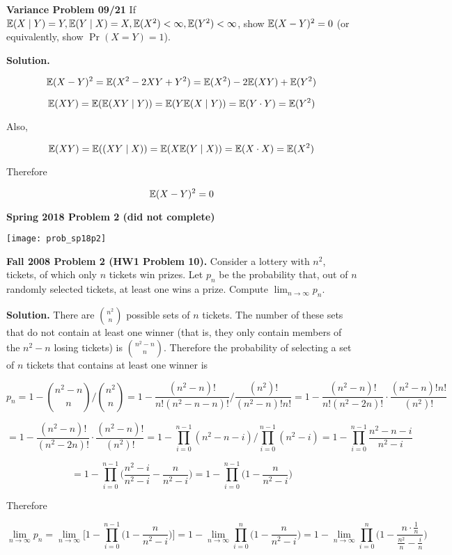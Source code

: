 \textbf{Variance Problem 09/21}  If \(\E(X \mid Y) = Y, \E(Y \mid X) = X, \E(X^2) < \infty, \E(Y^2) < \infty\), show \(\E(X-Y)^2 = 0 \) (or equivalently, show \(\Pr(X = Y) = 1\)).

\textbf{Solution.} 

\[
\E(X-Y)^2 = \E(X^2 - 2XY + Y^2) = \E(X^2) - 2 \E(XY) + \E(Y^2)
\]

\[
\E(XY) = \E( \E(XY\mid Y)) = \E(Y\E(X\mid Y)) = \E(Y \cdot Y) = \E(Y^2)
\]

Also,

\[
\E(XY) = \E((XY \mid X)) = \E(X \E(Y \mid X)) = \E( X \cdot X) = \E(X^2)
\]

Therefore

\[
\E(X-Y)^2 =0
\]


\textbf{Spring 2018 Problem 2 (did not complete)}

\texttt{[image: prob\_sp18p2]}

\textbf{Fall 2008 Problem 2 (HW1 Problem 10).} Consider a lottery with \(n^2\), tickets, of which only \(n\) tickets win prizes. Let \(p_n\) be the probability that, out of \(n\) randomly selected tickets, at least one wins a prize. Compute \(\lim_{n \to \infty} p_n\).

\textbf{Solution.} There are \(\binom{n^2}{n}\) possible sets of \(n\) tickets. The number of these sets that do not contain at least one winner (that is, they only contain members of the \(n^2 - n\) losing tickets) is \(\binom{n^2 - n}{n}\). Therefore the probability of selecting a set of \(n\) tickets that contains at least one winner is

\[
p_n = 1 - \binom{n^2 - n}{n} \bigg/ \binom{n^2}{n} = 1 - \frac{(n^2 - n)!}{n!(n^2 - n - n)!} \bigg/ \frac{(n^2)!}{(n^2 - n)!n!} = 1 - \frac{(n^2 - n)!}{n!(n^2 - 2n)!} \cdot \frac{(n^2 - n)!n!}{(n^2)!}
\]

\[
 = 1 - \frac{(n^2 - n)!}{(n^2 - 2n)!} \cdot \frac{(n^2 - n)!}{(n^2)!} = 1 - \prod_{i=0}^{n-1}(n^2 - n - i)  \bigg/ \prod_{i=0}^{n-1}(n^2 - i) = 1 - \prod_{i=0}^{n-1} \frac{n^2 - n - i}{n^2 - i}
\]

\[
= 1 - \prod_{i=0}^{n-1}\bigg( \frac{n^2 - i}{n^2 - i} -\frac{n}{n^2 - i} \bigg) = 1 - \prod_{i=0}^{n-1}\bigg(1-\frac{n}{n^2 - i} \bigg)
\]

Therefore

\[
\lim_{n \to \infty} p_n = \lim_{n \to \infty} \bigg[ 1 - \prod_{i=0}^{n-1}\bigg(1-\frac{n}{n^2 - i} \bigg) \bigg] = 1 - \lim_{n \to \infty} \prod_{i=0}^{n}\bigg(1-\frac{n}{n^2 - i} \bigg) = 1 - \lim_{n \to \infty} \prod_{i=0}^{n}\bigg(1-\frac{n \cdot \frac{1}{n}}{\frac{n^2}{n} - \frac{i}{n}} \bigg)
\]

